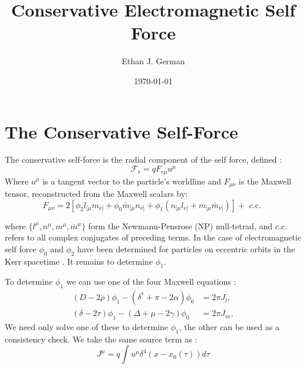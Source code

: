 \documentclass[preprint,showpacs,preprintnumbers,amssymb,superscriptaddress,aps,prd,nofootinbib,11pt]{revtex4-1}
\begin{document}
\preprint{}

 \title{Conservative Electromagnetic Self Force}


\author{Ethan J. German}
\date{\today}
\maketitle

\section{The Conservative Self-Force}
The conservative self-force is the radial component of the self force, defined \cite{TorresDolan2022}:
\begin{equation}
    \mathcal{F}_r = q F_{r\mu} u^\mu
\end{equation}
Where $u^\mu$ is a tangent vector to the particle's worldline and $F_{\mu\nu}$ is the Maxwell tensor, reconstructed from the Maxwell scalars by:
\begin{equation}
    F_{\mu \nu}=2\left[\phi_2 l_{[\mu} m_{\nu]}+\phi_0 \bar{m}_{[\mu} n_{\nu]}+\phi_1\left(n_{[\mu} l_{\nu]}+m_{[\mu} \bar{m}_{\nu]}\right)\right]+\text { c.c. }
\end{equation}

where $\{l^\mu,n^\mu, m^\mu, \bar{m}^\mu\}$ form the Newmann-Pensrose (NP) null-tetrad, and c.c. refers to all complex conjugates of preceding terms. In the case of electromagnetic self force $\phi_0$ and $\phi_2$ have been determined for particles on eccentric orbits in the Kerr spacetime \cite{german2023adiabatic}. It remains to determine $\phi_1$.

To determine $\phi_1$ we can use one of the four Maxwell equations \cite{Teukolsky:1973ha}:
\begin{equation}
\begin{aligned}
(D-2 \rho) \phi_1-\left(\delta^*+\pi-2 \alpha\right) \phi_0 & =2 \pi J_l, \\
(\delta-2 \tau) \phi_1-(\Delta+\mu-2 \gamma) \phi_0 & =2 \pi J_m, 
\end{aligned}
\end{equation}
We need only solve one of these to determine $\phi_1$, the other can be used as a consistency check. 
We take the same source term as \cite{german2023adiabatic}: 
\begin{equation}
J^\mu=q \int u^\mu \delta^4\left(x-x_0(\tau)\right) d \tau
\end{equation} 


\end{document}
